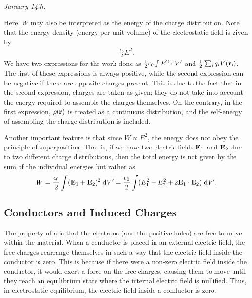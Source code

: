 \noindent \textit{January 14th.}

Here, $W$ may also be interpreted as the energy of the charge distribution. Note that the energy density (energy per unit volume) of the electrostatic field is given by
\begin{align}
    \frac{\epsilon_{0}}{2} E^{2}.
\end{align}
We have two expressions for the work  done as $\frac{1}{2} \epsilon_{0} \int E^{2} \; \mathrm{d}V'$ and $\frac{1}{2} \sum_{i} q_{i} V(\mathbf{r}_{i})$. The first of these expressions is always positive, while the second expression can be negative if there are opposite charges present. This is due to the fact that in the second expression, charges are taken as given; they do not take into account the energy required to assemble the charges themselves. On the contrary, in the first expression, $\rho(\mathbf{r})$ is treated as a continuous distribution, and the self-energy of assembling the charge distribution is included.

Another important feature is that since $W \propto E^{2}$, the energy does not obey the principle of superposition. That is, if we have two electric fields $\mathbf{E}_{1}$ and $\mathbf{E}_{2}$ due to two different charge distributions, then the total energy is not given by the sum of the individual energies but rather as
\begin{align}
    W = \frac{\epsilon_{0}}{2} \int (\mathbf{E}_{1} + \mathbf{E}_{2})^{2} \; \mathrm{d}V' = \frac{\epsilon_{0}}{2} \int (E_{1}^{2} + E_{2}^{2} + 2 \mathbf{E}_{1} \cdot \mathbf{E}_{2}) \; \mathrm{d}V'.
\end{align}


\subsection{Conductors and Induced Charges}

The property of a  is that the electrons (and the positive holes) are free to move within the material. When a conductor is placed in an external electric field, the free charges rearrange themselves in such a way that the electric field inside the conductor is zero. This is because if there were a non-zero electric field inside the conductor, it would exert a force on the free charges, causing them to move until they reach an equilibrium state where the internal electric field is nullified. Thus, in electrostatic equilibrium, the electric field inside a conductor is zero.

\newpage

